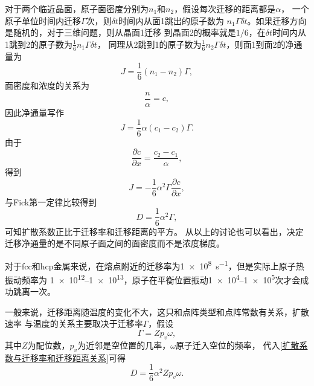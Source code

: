             对于两个临近晶面，原子面密度分别为$n_1$和$n_2$，假设每次迁移的距离都是$\alpha$，
            一个原子单位时间内迁移$\Gamma$次，则$\delta t$时间内从面1跳出的原子数为
            $n_1\Gamma\delta t$。如果迁移方向是随机的，对于三维问题，则从晶面1迁移
            到晶面2的概率就是$1/6$，在$\delta t$时间内从1跳到2的原子数为$\frac{1}{6}n_1\Gamma\delta t$，
            同理从2跳到1的原子数为$\frac{1}{6}n_2\Gamma\delta t$，则面1到面2的净通量为
            \begin{equation}
                J=\frac{1}{6}(n_1-n_2)\Gamma\label{迁移通量与面密度关系},
            \end{equation}
            面密度和浓度的关系为
            \begin{equation}
                \frac{n}{\alpha}=c,
            \end{equation}
            因此净通量写作
            \begin{equation}
                J=\frac{1}{6}\alpha\left( c_1-c_2 \right)\Gamma.
            \end{equation}
            由于
            \begin{equation}
                \frac{\partial c}{\partial x}=\frac{c_2-c_1}{\alpha},
            \end{equation}
            得到
            \begin{equation}
                J=-\frac{1}{6}\alpha^2\Gamma\frac{\partial c}{\partial x},
            \end{equation}
            与Fick第一定律比较得到
            \begin{equation}
                D=\frac{1}{6}\alpha^2\Gamma\label{扩散系数与迁移率和迁移距离关系},
            \end{equation}
            可知扩散系数正比于迁移率和迁移距离的平方。
            从以上的讨论也可以看出，决定迁移净通量的是不同原子面之间的面密度而不是浓度梯度。

            对于fcc和hcp金属来说，在熔点附近的迁移率为\SI{1e8}{\s^{-1}}，但是实际上原子热振动频率为
            \numrange{1e12}{1e13}，原子在平衡位置振动\numrange{1e4}{1e5}次才会成功跳离一次。

            一般来说，迁移距离随温度的变化不大，这只和点阵类型和点阵常数有关系，扩散速率
            与温度的关系主要取决于迁移率$\Gamma$，假设
            \begin{equation}
                \Gamma=Zp_v\omega,
            \end{equation}
            其中$Z$为配位数，$p_v$为近邻是空位置的几率，$\omega$原子迁入空位的频率，
            代入\autoref{扩散系数与迁移率和迁移距离关系}可得
            \begin{equation}
                D=\frac{1}{6}\alpha^2Zp_v\omega.
            \end{equation}

